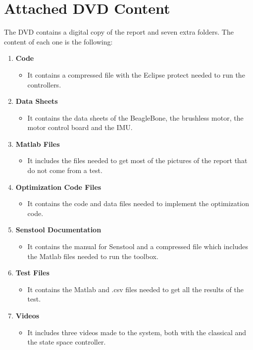 \chapter{Attached DVD Content}

The DVD contains a digital copy of the report and seven extra folders. The content of each one is the following:
\begin{enumerate}
	\item \textbf{Code}
	\begin{itemize}
		\item[] It contains a compressed file with the Eclipse protect needed to run the controllers.
	\end{itemize}
	
	\item \textbf{Data Sheets}  
	\begin{itemize}
		\item[] It contains the data sheets of the BeagleBone, the brushless motor, the motor control board and the IMU.
	\end{itemize}
	
	\item \textbf{Matlab Files}  
	\begin{itemize}
		\item[] It includes the files needed to get most of the pictures of the report that do not come from a test.
	\end{itemize}
	
	\item \textbf{Optimization Code Files}  
	\begin{itemize}
		\item[] It contains the code and data files needed to implement the optimization code.
	\end{itemize}
	
	\item \textbf{Senstool Documentation}  
	\begin{itemize}
		\item[] It contains the manual for Senstool and a compressed file which includes the Matlab files needed to run the toolbox.
	\end{itemize}	
	
	\item \textbf{Test Files}  
	\begin{itemize}
		\item[] It contains the Matlab and .csv files needed to get all the results of the test.
	\end{itemize}

	\item \textbf{Videos}  
	\begin{itemize}
		\item[] It includes three videos made to the system, both with the classical and the state space controller. 
	\end{itemize}
\end{enumerate}
